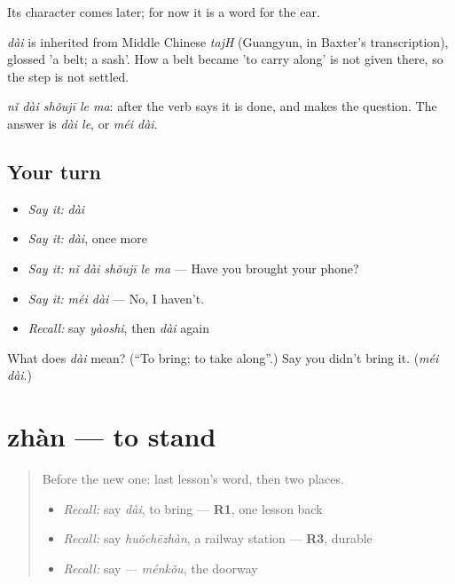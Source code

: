 Its character comes later; for now it is a word for the ear.

\begin{cousinweb}
\emph{dài} is inherited from Middle Chinese \emph{tajH} (Guangyun, in Baxter's transcription), glossed 'a belt; a sash'. How a belt became 'to carry along' is not given there, so the step is not settled.
\end{cousinweb}

\begin{grammarlens}[title={What you've built}]
\emph{nǐ dài shǒujī le ma}:  after the verb says it is done, and  makes the question. The answer is \emph{dài le}, or \emph{méi dài}.
\end{grammarlens}

\subsection*{Your turn}
\begin{itemize}
\raggedright
  \item \emph{Say it:} \emph{dài}
  \item \emph{Say it:} \emph{dài}, once more
  \item \emph{Say it:} \emph{nǐ dài shǒujī le ma} — Have you brought your phone?
  \item \emph{Say it:} \emph{méi dài} — No, I haven't.
  \item \emph{Recall:} say \emph{yàoshi}, then \emph{dài} again
\end{itemize}

\begin{tcolorbox}[breakable,colback=teal!4,colframe=teal!35!black,title={Before you move on}]
What does \emph{dài} mean? (\textquotedblleft{}To bring; to take along\textquotedblright{}.) Say you didn't bring it. (\emph{méi dài}.)
\end{tcolorbox}
\section[zhàn]{zhàn — to stand}

\label{lesson:ZH-C89-zhan}



\begin{quote}
Before the new one: last lesson's word, then two places.

\begin{itemize}
\raggedright
  \item \emph{Recall:} say \emph{dài}, to bring — \textbf{R1}, one lesson back
  \item \emph{Recall:} say \emph{huǒchēzhàn}, a railway station — \textbf{R3}, durable
  \item \emph{Recall:} say  — \emph{ménkǒu}, the doorway
\end{itemize}
\end{quote}

